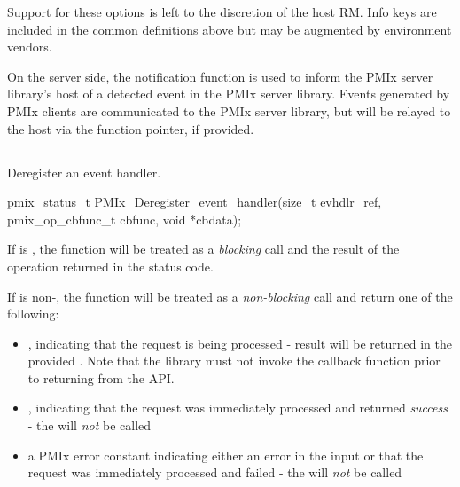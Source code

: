 Support for these options is left to the discretion of the host \ac{RM}. Info keys are included in the common definitions above but may be augmented by environment vendors.
\adviceuserend

\advicermstart
On the server side, the notification function is used to inform the \ac{PMIx} server library's host of a detected event in the \ac{PMIx} server library. Events generated by \ac{PMIx} clients are communicated to the \ac{PMIx} server library, but will be relayed to the host via the  function pointer, if provided.
\advicermend


\subsection{}

\summary

Deregister an event handler.

\format

\cspecificstart
\begin{codepar}
pmix_status_t
PMIx_Deregister_event_handler(size_t evhdlr_ref,
                              pmix_op_cbfunc_t cbfunc,
                              void *cbdata);
\end{codepar}
\cspecificend

\begin{arglist}
\end{arglist}

If  is , the function will be treated as a \emph{blocking} call and the result of the operation returned in the status code.

If  is non-, the function will be treated as a \emph{non-blocking} call and return one of the following:

\begin{itemize}
\item {}, indicating that the request is being processed - result will be returned in the provided . Note that the library must not invoke the callback function prior to returning from the \ac{API}.
\item {}, indicating that the request was immediately processed and returned \textit{success} - the  will \textit{not} be called
\item a PMIx error constant indicating either an error in the input or that the request was immediately processed and failed - the  will \textit{not} be called
\end{itemize}

